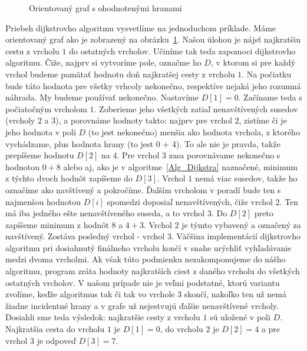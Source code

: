 \begin{figure}[H]
  \caption{Orientovaný graf s ohodnotenými hranami}
  \label{dijkstra_priklad}
\end{figure}

Priebeh dijkstrovho algoritmu vysvetlíme na jednoduchom príklade. Máme orientovaný graf ako je zobrazený na obrázku~\ref{dijkstra_priklad}. Našou úlohou je nájsť najkratšiu cestu z vrcholu $1$ do ostatných vrcholov. Učiníme tak teda zapomoci dijkstrovho algoritmu. Čiže, najprv si vytvoríme pole, označme ho $D$, v ktorom si pre každý vrchol budeme pamätať hodnotu doň najkratšej cesty z vrcholu $1$. Na počiatku bude táto hodnota pre všetky vrhcoly nekonečno, respektíve nejaká jeho rozumná náhrada. My budeme používať nekonečno. Nastavíme $D [1] = 0$. Začíname teda s počiatočným vrcholom $1$. Zoberieme jeho všetkých zatiaľ nenavštívených susedov (vrcholy $2$ a $3$), a porovnáme hodnoty takto: najprv pre vrchol $2$, zistíme či je jeho hodnota v poli $D$ (to jest nekonečno) menšia ako hodnota vrchola, z ktorého vychádzame, plus hodnota hrany (to jest 0 + 4). To ale nie je pravda, takže prepíšeme hodnotu $D [2]$ na $4$. Pre vrchol $3$ zasa porovnávame nekonečno s hodnotou $0+8$ alebo aj, ako je v algoritme~\ref{Alg_Dijkstra} naznačené, minimum z týchto dvoch hodnôt zapíšeme do $D [3]$. Vrchol $1$ nemá viac susedov, takže ho označíme ako navštívený a pokročíme. Ďalším vrcholom v poradí bude ten s najmenšou hodnotou $D [i]$ spomedzi doposiaľ nenavštívených, čiže vrchol $2$. Ten má iba jedného ešte nenavštíveného suseda, a to vrchol $3$. Do $D [2]$ preto zapíšeme minimum z hodnôt $8$ a $4 + 3$. Vrchol $2$ je týmto vybavený a označený za navštívený. Zostáva posledný vrchol - vrchol $3$. Väčšina implementácií dijkstrovho algoritmu pri dosiahnutý finálneho vrcholu končí v snahe urýchliť vyhľadávanie medzi dvoma vrcholmi. Ak vśak túto podmienku nezakomponujeme do nášho algoritmu, program zráta hodnoty najkratších ciest z daného vrcholu do všetkých ostatných vrcholov. V našom prípade nie je veľmi podstatné, ktorú variantu zvolíme, keďže algoritmus tak či tak vo vrchole $3$ skončí, nakoľko ten už nemá žiadne incidentné hrany a v grafe už nejestvujú ďalšie nenavštívené vrcholy. Dosiahli sme teda výsledok: najkratšie cesty z vrcholu $1$ sú uložené v poli $D$. Najkratšia cesta do vrcholu $1$ je $D [1] = 0$, do vrcholu $2$ je $D [2] = 4$ a pre vrchol $3$ je odpoveď $D [3] = 7$.\newline

